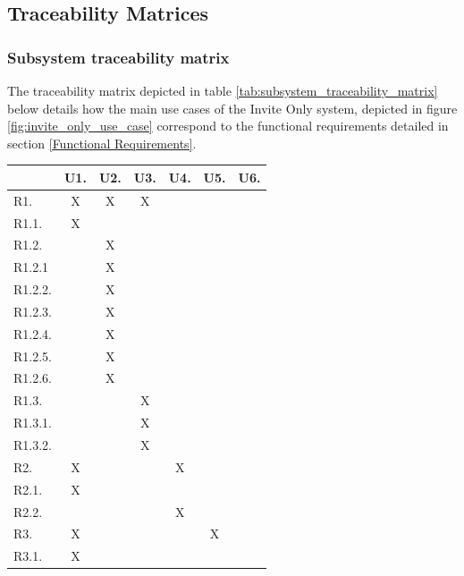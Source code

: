 \newpage

\subsection{Traceability Matrices}

\subsubsection{Subsystem traceability matrix}
The traceability matrix depicted in table \ref{tab:subsystem_traceability_matrix} below details how the main use cases of the Invite Only system, depicted in figure \ref{fig:invite_only_use_case} correspond to the functional requirements detailed in section \ref{Functional Requirements}.

\begin{table}[H]
\centering
\begin{tabular}{|l|c|c|c|c|c|c|}
\hline
        & U1. & U2. & U3. & U4. & U5. & U6. \\ \hline
R1.     & X   & X   & X   &     &     &     \\ \hline
R1.1.   & X   &     &     &     &     &     \\ \hline
R1.2.   &     & X   &     &     &     &     \\ \hline
R1.2.1  &     & X   &     &     &     &     \\ \hline
R1.2.2. &     & X   &     &     &     &     \\ \hline
R1.2.3. &     & X   &     &     &     &     \\ \hline
R1.2.4. &     & X   &     &     &     &     \\ \hline
R1.2.5. &     & X   &     &     &     &     \\ \hline
R1.2.6. &     & X   &     &     &     &     \\ \hline
R1.3.   &     &     & X   &     &     &     \\ \hline
R1.3.1. &     &     & X   &     &     &     \\ \hline
R1.3.2. &     &     & X   &     &     &     \\ \hline
R2.     & X   &     &     & X   &     &     \\ \hline
R2.1.   & X   &     &     &     &     &     \\ \hline
R2.2.   &     &     &     & X   &     &     \\ \hline
R3.     & X   &     &     &     & X   &     \\ \hline
R3.1.   & X   &     &     &     &     &     \\ \hline

\end{tabular}
\end{table}
